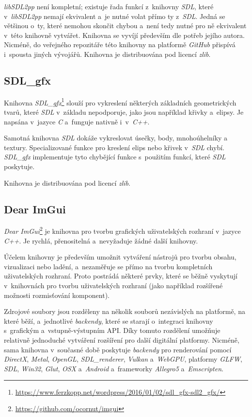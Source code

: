 \emph{libSDL2pp} není kompletní; existuje řada funkcí z~knihovny \emph{SDL}, které v~\emph{libSDL2pp} nemají ekvivalent a~je nutné volat přímo ty z~\emph{SDL}. Jedná se většinou o~ty, které nemohou skončit chybou a~není tedy nutné pro ně ekvivalent v~této knihovně vytvářet. Knihovna se vyvíjí především dle potřeb jejího autora. Nicméně, do veřejného repozitáře této knihovny na platformě \emph{GitHub} přispívá i~spousta jiných vývojářů. Knihovna je distribuována pod licencí \emph{zlib}.

\subsection*{SDL\_gfx}

Knihovna \emph{SDL\_gfx}\footnote{\url{https://www.ferzkopp.net/wordpress/2016/01/02/sdl_gfx-sdl2_gfx/}} slouží pro vykreslení některých základních geometrických tvarů, které \emph{SDL} v~základu nepodporuje, jako jsou například křivky a~elipsy. Je napsána v~jazyce \emph{C} a~funguje nativně i~v~\emph{C++}.

Samotná knihovna \emph{SDL} dokáže vykreslovat úsečky, body, mnohoúhelníky a textury. Specializované funkce pro kreslení elips nebo křivek v~\emph{SDL} chybí. \emph{SDL\_gfx} implementuje tyto chybějící funkce s~použitím funkcí, které \emph{SDL} poskytuje.

Knihovna je distribuována pod licencí \emph{zlib}.

\subsection*{Dear ImGui}

\emph{Dear ImGui}\footnote{\url{https://github.com/ocornut/imgui}} je knihovna pro tvorbu grafických uživatelských rozhraní v~jazyce \emph{C++}. Je rychlá, přenositelná a~nevyžaduje žádné další knihovny.

Účelem knihovny je především umožnit vytváření nástrojů pro tvorbu obsahu, vizualizaci nebo ladění, a~nezaměřuje se přímo na tvorbu kompletních uživatelských rozhraní. Proto postrádá některé prvky, které se běžně vyskytují v~knihovnách pro tvorbu uživatelských rozhraní (jako například rozšířené možnosti rozmisťování komponent).

Zdrojové soubory jsou rozděleny na několik souborů nezávislých na platformě, na které běží, a~jednotlivé \emph{backendy}, které se starají o~integraci knihovny s~grafickým a~vstupně-výstupním API. Díky tomuto rozdělení umožňuje relativně jednoduché vytváření rozšíření pro další digitální platformy. Nicméně, sama knihovna v~současné době poskytuje \emph{backendy} pro renderování pomocí \emph{DirectX}, \emph{Metal}, \emph{OpenGL}, \emph{SDL\_renderer}, \emph{Vulkan} a~\emph{WebGPU}, platformy \emph{GLFW}, \emph{SDL}, \emph{Win32}, \emph{Glut}, \emph{OSX} a~\emph{Android} a~frameworky \emph{Allegro5} a~\emph{Emscripten}.

